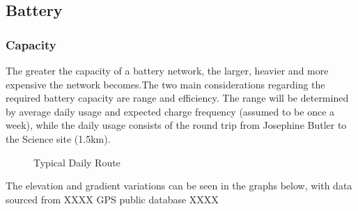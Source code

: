 \documentclass[journal,10pt]{IEEEtran}
\begin{document}
    \subsection{Battery}
        \subsubsection{Capacity}
            The greater the capacity of a battery network, the larger, heavier and more expensive the network becomes.The two main considerations regarding the required battery capacity are range and efficiency. The range will be determined by average daily usage and expected charge frequency (assumed to be once a week), while the daily usage consists of the round trip from Josephine Butler to the Science site (1.5km).
            \begin{figure}[H]
                \centering
                \caption{Typical Daily Route}
                \label{fig:route}
            \end{figure}
            The elevation and gradient variations can be seen in the graphs below, with data sourced from XXXX GPS public database XXXX
\end{document}
